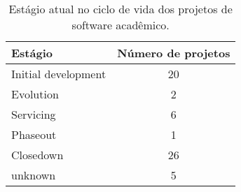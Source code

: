 \begin{table}[h]
\caption{Estágio atual no ciclo de vida dos projetos de software acadêmico.}
\centering
\begin{tabular}{l c}
  \hline
  {\bf Estágio} & {\bf Número de projetos} \\
  \hline
    Initial development & 20 \\
    Evolution & 2 \\
    Servicing & 6 \\
    Phaseout & 1 \\
    Closedown & 26 \\
    unknown & 5 \\
  \hline
\end{tabular}
\label{life-cycle-table}
\end{table}
